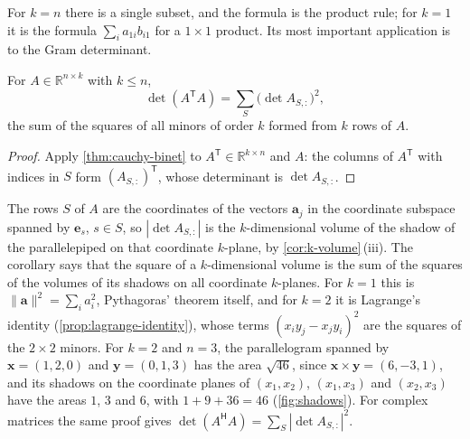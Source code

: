 For $k=n$ there is a single subset, and the formula is the product rule; for $k=1$ it is the formula $\sum_ia_{1i}b_{i1}$ for a $1\times1$ product. Its most important application is to the Gram determinant.

\begin{corollary}
\label{cor:pythagoras-volumes}
For $A\in\mathbb R^{n\times k}$ with $k\le n$,
\[
\det(A^{\mathsf T}A)=\sum_S\bigl(\det A_{S,:}\bigr)^2,
\]
the sum of the squares of all minors of order $k$ formed from $k$ rows of $A$.
\end{corollary}

\begin{proof}
Apply \cref{thm:cauchy-binet} to $A^{\mathsf T}\in\mathbb R^{k\times n}$ and $A$: the columns of $A^{\mathsf T}$ with indices in $S$ form $(A_{S,:})^{\mathsf T}$, whose determinant is $\det A_{S,:}$.
\end{proof}

The rows $S$ of $A$ are the coordinates of the vectors $\mathbf a_j$ in the coordinate subspace spanned by $\mathbf e_s$, $s\in S$, so $|\det A_{S,:}|$ is the $k$-dimensional volume of the shadow of the parallelepiped on that coordinate $k$-plane, by \cref{cor:k-volume}\,(iii). The corollary says that the square of a $k$-dimensional volume is the sum of the squares of the volumes of its shadows on all coordinate $k$-planes. For $k=1$ this is $\|\mathbf a\|^2=\sum_ia_i^2$, Pythagoras' theorem itself, and for $k=2$ it is Lagrange's identity (\cref{prop:lagrange-identity}), whose terms $(x_iy_j-x_jy_i)^2$ are the squares of the $2\times2$ minors. For $k=2$ and $n=3$, the parallelogram spanned by $\mathbf x=(1,2,0)$ and $\mathbf y=(0,1,3)$ has the area $\sqrt{46}$, since $\mathbf x\times\mathbf y=(6,-3,1)$, and its shadows on the coordinate planes of $(x_1,x_2)$, $(x_1,x_3)$ and $(x_2,x_3)$ have the areas $1$, $3$ and $6$, with $1+9+36=46$ (\cref{fig:shadows}). For complex matrices the same proof gives $\det(A^{\mathsf H}A)=\sum_S|\det A_{S,:}|^2$.


